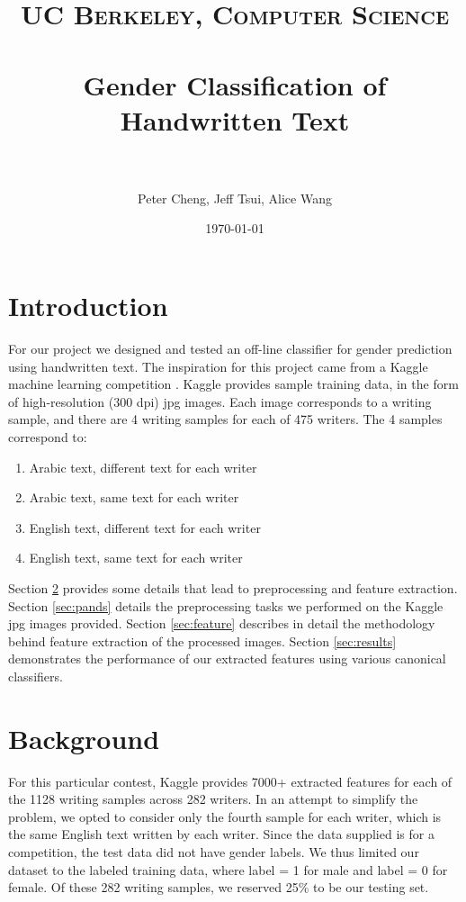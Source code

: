 \documentclass[paper=a4, fontsize=11pt]{scrartcl} %
\title{	
\normalfont \normalsize 
\textsc{UC Berkeley, Computer Science} \\ [25pt] %
\horrule{0.5pt} \\[0.4cm] %
\huge Gender Classification of Handwritten Text \\ %
\horrule{2pt} \\[0.5cm] %
}
\author{Peter Cheng, Jeff Tsui, Alice Wang} %
\date{\normalsize\today} %
\numberwithin{equation}{section} %
\numberwithin{figure}{section} %
\numberwithin{table}{section} %
\begin{document}
\maketitle %

\section{Introduction}
For our project we designed and tested an off-line classifier for
gender prediction using handwritten text. The inspiration for this
project came from a Kaggle machine learning competition
\cite{kaggle}. Kaggle provides sample training data, in the form of
high-resolution (300 dpi) jpg images. Each image corresponds to a
writing sample, and there are 4 writing samples for each of 475
writers. The 4 samples correspond to:

\begin{enumerate}
\item Arabic text, different text for each writer
\item Arabic text, same text for each writer
\item English text, different text for each writer
\item English text, same text for each writer
\end{enumerate}

Section \ref{sec:background} provides some details that lead to
preprocessing and feature extraction. Section \ref{sec:pands} details
the preprocessing tasks we performed on the Kaggle jpg images
provided. Section \ref{sec:feature} describes in detail the
methodology behind feature extraction of the processed images. Section
\ref{sec:results} demonstrates the performance of our extracted
features using various canonical classifiers.

\section{Background}
\label{sec:background}
For this particular contest, Kaggle provides 7000+ extracted features
for each of the 1128 writing samples across 282 writers. In an attempt
to simplify the problem, we opted to consider only the fourth sample
for each writer, which is the same English text written by each
writer. Since the data supplied is for a competition, the test data
did not have gender labels. We thus limited our dataset to the labeled
training data, where label = 1 for male and label = 0 for female. Of
these 282 writing samples, we reserved 25\% to be our testing set.
\end{document}
